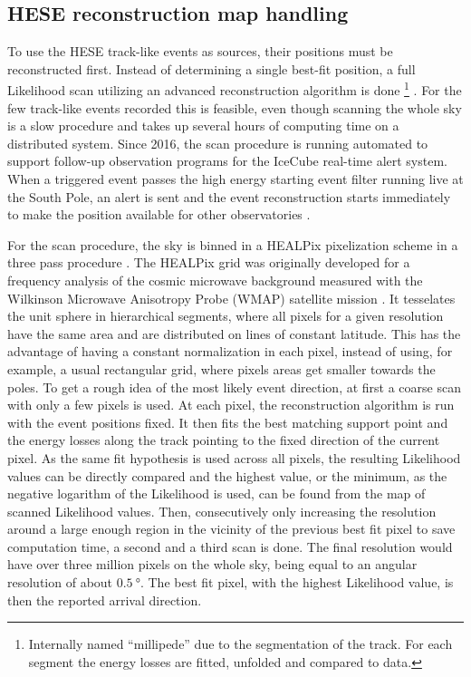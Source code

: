 \subsection{HESE reconstruction map handling}
To use the HESE track-like events as sources, their positions must be reconstructed first.
Instead of determining a single best-fit position, a full Likelihood scan utilizing an advanced reconstruction algorithm is done \footnote{Internally named \enquote{millipede} due to the segmentation of the track. For each segment the energy losses are fitted, unfolded and compared to data.} .
For the few track-like events recorded this is feasible, even though scanning the whole sky is a slow procedure and takes up several hours of computing time on a distributed system.
Since 2016, the scan procedure is running automated to support follow-up observation programs for the IceCube real-time alert system.
When a triggered event passes the high energy starting event filter running live at the South Pole, an alert is sent and the event reconstruction starts immediately to make the position available for other observatories .

For the scan procedure, the sky is binned in a HEALPix pixelization scheme in a three pass procedure .
The HEALPix grid was originally developed for a frequency analysis of the cosmic microwave background measured with the Wilkinson Microwave Anisotropy Probe (WMAP) satellite mission .
It tesselates the unit sphere in hierarchical segments, where all pixels for a given resolution have the same area and are distributed on lines of constant latitude.
This has the advantage of having a constant normalization in each pixel, instead of using, for example, a usual rectangular grid, where pixels areas get smaller towards the poles.
To get a rough idea of the most likely event direction, at first a coarse scan with only a few pixels is used.
At each pixel, the reconstruction algorithm is run with the event positions fixed.
It then fits the best matching support point and the energy losses along the track pointing to the fixed direction of the current pixel.
As the same fit hypothesis is used across all pixels, the resulting Likelihood values can be directly compared and the highest value, or the minimum, as the negative logarithm of the Likelihood is used, can be found from the map of scanned Likelihood values.
Then, consecutively only increasing the resolution around a large enough region in the vicinity of the previous best fit pixel to save computation time, a second and a third scan is done.
The final resolution would have over three million pixels on the whole sky, being equal to an angular resolution of about $\SI{0.5}{\degree}$.
The best fit pixel, with the highest Likelihood value, is then the reported arrival direction.

